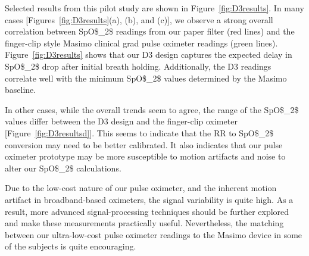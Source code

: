Selected results from this pilot study are shown in Figure~\ref{fig:D3results}. In many cases [Figures~\ref{fig:D3results}(a), (b), and (c)], we observe a strong overall correlation between \ac{SpO$_2$} readings from our paper filter (red lines) and the finger-clip style Masimo clinical grad pulse oximeter readings (green lines). Figure~\ref{fig:D3results} shows that our D3 design captures the expected delay in \ac{SpO$_2$} drop after initial breath holding. Additionally, the D3 readings correlate well with the minimum \ac{SpO$_2$} values determined by the Masimo baseline. 

In other cases, while the overall trends seem to agree, the range of the \ac{SpO$_2$} values differ between the D3 design and the finger-clip oximeter [Figure~\ref{fig:D3resultsd}]. This seems to indicate that the \ac{RR} to \ac{SpO$_2$} conversion may need to be better calibrated. It also indicates that our pulse oximeter prototype may be more susceptible to motion artifacts and noise to alter our \ac{SpO$_2$} calculations. 

Due to the low-cost nature of our pulse oximeter, and the inherent motion artifact in broadband-based oximeters, the signal variability is quite high. As a result, more advanced signal-processing techniques should be further explored and make these measurements practically useful. Nevertheless, the matching between our ultra-low-cost pulse oximeter readings to the Masimo device in some of the subjects is quite encouraging. 



